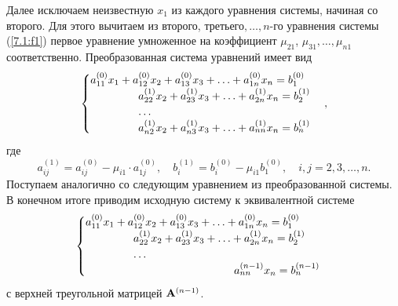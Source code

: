 \documentclass[12pt]{article}
\begin{document}
    Далее исключаем неизвестную $x_1$ из каждого уравнения системы, начиная со второго. Для этого вычитаем из второго, третьего$,\ldots, n$-го уравнения системы (\ref{7.1:f1}) первое уравнение умноженное на коэффициент $\mu_{21}$, $\mu_{31},\ldots, \mu_{n1}$ соответственно. Преобразованная система уравнений имеет вид
    \begin{equation}
    	\begin{cases}
    		a_{11}^{\left(0\right)}x_1+a_{12}^{\left(0\right)}x_2+a_{13}^{\left(0\right)}x_3+\ldots+a_{1n}^{\left(0\right)}x_n=b_1^{\left(0\right)}\\
    		\hspace{15.3mm} a_{22}^{\left(1\right)}x_2+a_{23}^{\left(1\right)}x_3+\ldots+a_{2n}^{\left(1\right)}x_n=b_{2}^{\left(1\right)}\\
    		\hspace{15.3mm}\ldots\\
    		\hspace{15.3mm} a_{n2}^{\left(1\right)}x_2+a_{n3}^{\left(1\right)}x_3+\ldots+a_{nn}^{\left(1\right)}x_n=b_{n}^{\left(1\right)}\\
    	\end{cases},
    	\label{7.1:f3}
    \end{equation}
    где
    \begin{equation}
        a_{ij}^{\left(1\right)}=a_{ij}^{\left(0\right)}-\mu_{i1}\cdot a^{\left(0\right)}_{1j},\quad b_{i}^{\left(1\right)}=b_{i}^{\left(0\right)}-\mu_{i1}{b^{\left(0\right)}_{1}},\quad i,j=2,3,\ldots,n.\label{7.1:f4_1}
    \end{equation}
    Поступаем аналогично со следующим уравнением из преобразованной системы. В конечном итоге приводим исходную систему к эквивалентной системе
    \begin{equation}
    	\begin{cases}
    		a_{11}^{\left(0\right)}x_1+a_{12}^{\left(0\right)}x_2+a_{13}^{\left(0\right)}x_3+\ldots+a_{1n}^{\left(0\right)}x_n=b_1^{\left(0\right)}\\
    		\hspace{15.3mm} a_{22}^{\left(1\right)}x_2+a_{23}^{\left(1\right)}x_3+\ldots+a_{2n}^{\left(1\right)}x_n=b_{2}^{\left(1\right)}\\
    		\hspace{15.3mm}\ldots\\
    		\hspace{47.5mm} a_{nn}^{\left(n-1\right)}x_n=b_{n}^{\left(n-1\right)}\\
    	\end{cases}
    	\label{7.1:f4}
    \end{equation}
    с верхней треугольной матрицей $\bold{A}^{\left(n-1\right)}$.
    
\end{document}
